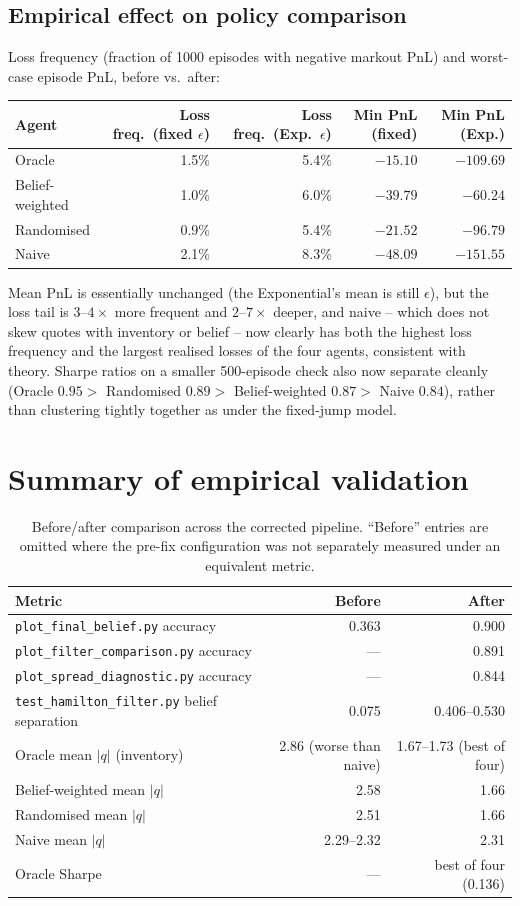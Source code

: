 \documentclass[11pt]{article}
\begin{document}
\subsection{Empirical effect on policy comparison}
Loss frequency (fraction of 1000 episodes with negative markout PnL) and worst-case episode PnL, before vs.\ after:
\begin{center}
\begin{tabular}{@{}lrrrr@{}}
\toprule
Agent & Loss freq.\ (fixed $\epsilon$) & Loss freq.\ (Exp.\ $\epsilon$) & Min PnL (fixed) & Min PnL (Exp.) \\
\midrule
Oracle & 1.5\% & 5.4\% & $-15.10$ & $-109.69$ \\
Belief-weighted & 1.0\% & 6.0\% & $-39.79$ & $-60.24$ \\
Randomised & 0.9\% & 5.4\% & $-21.52$ & $-96.79$ \\
Naive & 2.1\% & 8.3\% & $-48.09$ & $-151.55$ \\
\bottomrule
\end{tabular}
\end{center}
Mean PnL is essentially unchanged (the Exponential's mean is still $\epsilon$), but the loss tail is $3$--$4\times$ more frequent and $2$--$7\times$ deeper, and naive -- which does not skew quotes with inventory or belief -- now clearly has both the highest loss frequency and the largest realised losses of the four agents, consistent with theory. Sharpe ratios on a smaller 500-episode check also now separate cleanly (Oracle $0.95>$ Randomised $0.89>$ Belief-weighted $0.87>$ Naive $0.84$), rather than clustering tightly together as under the fixed-jump model.

\section{Summary of empirical validation}

\begin{table}[h]
\centering
\begin{tabular}{@{}lrr@{}}
\toprule
Metric & Before & After \\
\midrule
\texttt{plot\_final\_belief.py} accuracy & 0.363 & 0.900 \\
\texttt{plot\_filter\_comparison.py} accuracy & --- & 0.891 \\
\texttt{plot\_spread\_diagnostic.py} accuracy & --- & 0.844 \\
\texttt{test\_hamilton\_filter.py} belief separation & 0.075 & 0.406--0.530 \\
Oracle mean $|q|$ (inventory) & 2.86 (worse than naive) & 1.67--1.73 (best of four) \\
Belief-weighted mean $|q|$ & 2.58 & 1.66 \\
Randomised mean $|q|$ & 2.51 & 1.66 \\
Naive mean $|q|$ & 2.29--2.32 & 2.31 \\
Oracle Sharpe & --- & best of four (0.136) \\
\bottomrule
\end{tabular}
\caption{Before/after comparison across the corrected pipeline. ``Before'' entries are omitted where the pre-fix configuration was not separately measured under an equivalent metric.}
\end{table}
\end{document}
